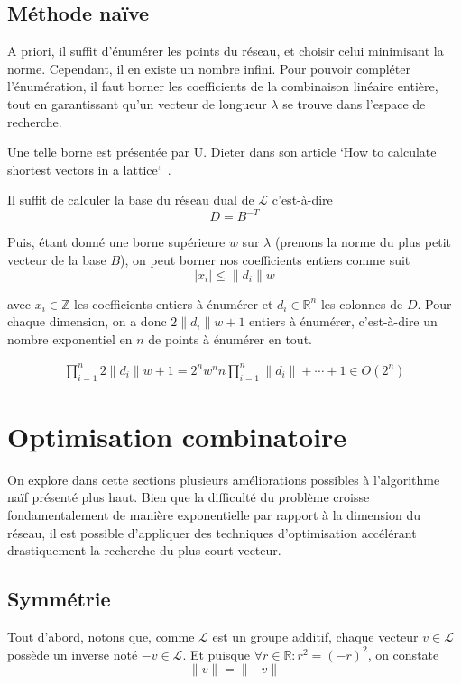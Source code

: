 \documentclass{article}
\begin{document}
\subsection{Méthode naïve}

A priori, il suffit d'énumérer les points du réseau, et choisir celui minimisant la norme. Cependant, il en existe un nombre infini. Pour pouvoir compléter l'énumération, il faut borner les coefficients de la combinaison linéaire entière, tout en garantissant qu'un vecteur de longueur $\lambda$ se trouve dans l'espace de recherche.

Une telle borne est présentée par U. Dieter dans son article `How to calculate shortest vectors in a lattice`~\cite{svp}.

Il suffit de calculer la base du réseau dual de $\mathcal{L}$ c'est-à-dire \[D = B^{-T}\] 

Puis, étant donné une borne supérieure $w$ sur $\lambda$ (prenons la norme du plus petit vecteur de la base $B$), on peut borner nos coefficients entiers comme suit
\[
    |x_i| \leq \lVert d_i \rVert w
\]

avec $x_i \in \mathbb{Z}$ les coefficients entiers à énumérer et $d_i \in \mathbb{R}^n$ les colonnes de $D$. Pour chaque dimension, on a donc $2 \lVert d_i \rVert w + 1$ entiers à énumérer, c'est-à-dire un nombre exponentiel en $n$ de points à énumérer en tout.

\begin{align*}
    \prod_{i=1}^{n}{2 \lVert d_i \rVert w + 1}
    = 2^n w^n n \prod_{i=1}^{n}{\lVert d_i \rVert } + \cdots + 1
    \in O(2^n)
\end{align*}

\section{Optimisation combinatoire}

On explore dans cette sections plusieurs améliorations possibles à l'algorithme naïf présenté plus haut. Bien que la difficulté du problème croisse fondamentalement de manière exponentielle par rapport à la dimension du réseau, il est possible d'appliquer des techniques d'optimisation accélérant drastiquement la recherche du plus court vecteur.

\subsection{Symmétrie}

Tout d'abord, notons que, comme $\mathcal{L}$ est un groupe additif, chaque vecteur $v \in \mathcal{L}$ possède un inverse noté $-v \in \mathcal{L}$. Et puisque $\forall r \in \mathbb{R}: r^2 = {(-r)}^2$, on constate 
\[ \lVert v \rVert = \lVert -v \rVert \]
\end{document}
